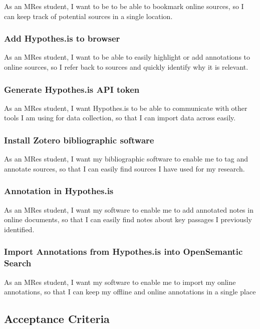 \documentclass{article}
\begin{document}
As an MRes student, I want to be to be able to bookmark online sources, so I can keep track of potential sources in a single location.

\subsubsection*{Add Hypothes.is to browser}

As an MRes student, I want to be able to easily highlight or add annotations to online sources, so I refer back to sources and quickly identify why it is relevant.

\subsubsection*{Generate Hypothes.is API token}

As an MRes student, I want Hypothes.is to be able to communicate with other tools I am using for data collection, so that I can import data across easily.

\subsubsection*{Install Zotero bibliographic software}

As an MRes student, I want my bibliographic software to enable me to tag and annotate sources, so that I can easily find sources I have used for my research.

\subsubsection*{Annotation in Hypothes.is}

As an MRes student, I want my software to enable me to add annotated notes in online documents, so that I can easily find notes about key passages I previously identified.

\subsubsection*{Import Annotations from Hypothes.is into OpenSemantic Search}

As an MRes student, I want my software to enable me to import my online annotations, so that I can keep my offline and online annotations in a single place

\subsection*{Acceptance Criteria}
\end{document}
